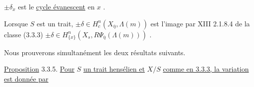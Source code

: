 \begin{center}
\end{center}
$\pm \delta_x$ est le \underline{cycle évanescent} en $x$ .

Lorsque $S$ est un trait, $\pm \delta \in H^n_c(X_{\overline{\eta}},\Lambda(m))$ est l'image par XIII 2.1.8.4 de la classe (3.3.3) $\pm \delta \in H^n_{\{x\}}(X_s,R\Psi_{\overline{\eta}}(\Lambda(m)))$ .

Nous prouverons simultanément les deux résultats suivants.

\underline{Proposition} 3.3.5. \underline{Pour} $S$ \underline{un trait hensélien et} $X/S$ \underline{comme en 3.3.3, la variation est donnée par}

